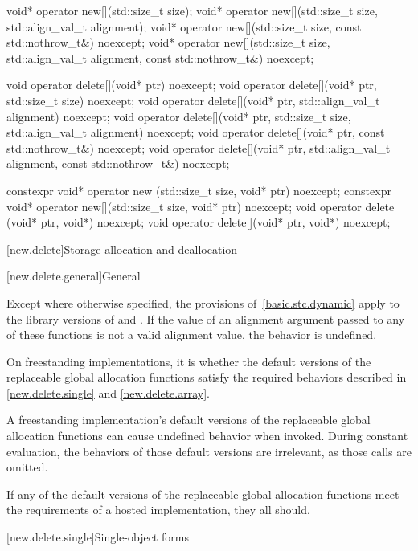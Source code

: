 \begin{codeblock}
void* operator new[](std::size_t size);
void* operator new[](std::size_t size, std::align_val_t alignment);
void* operator new[](std::size_t size, const std::nothrow_t&) noexcept;
void* operator new[](std::size_t size, std::align_val_t alignment,
                     const std::nothrow_t&) noexcept;

void operator delete[](void* ptr) noexcept;
void operator delete[](void* ptr, std::size_t size) noexcept;
void operator delete[](void* ptr, std::align_val_t alignment) noexcept;
void operator delete[](void* ptr, std::size_t size, std::align_val_t alignment) noexcept;
void operator delete[](void* ptr, const std::nothrow_t&) noexcept;
void operator delete[](void* ptr, std::align_val_t alignment, const std::nothrow_t&) noexcept;

constexpr void* operator new  (std::size_t size, void* ptr) noexcept;
constexpr void* operator new[](std::size_t size, void* ptr) noexcept;
void operator delete  (void* ptr, void*) noexcept;
void operator delete[](void* ptr, void*) noexcept;
\end{codeblock}

[new.delete]{Storage allocation and deallocation}

[new.delete.general]{General}

\pnum
Except where otherwise specified, the provisions of~\ref{basic.stc.dynamic}
apply to the library versions of  and .
If the value of an alignment argument
passed to any of these functions
is not a valid alignment value,
the behavior is undefined.

\pnum
On freestanding implementations,
it is 
whether the default versions of the replaceable global allocation functions
satisfy the required behaviors
described in \ref{new.delete.single} and \ref{new.delete.array}.
\begin{note}
A freestanding implementation's default versions of
the replaceable global allocation functions
can cause undefined behavior when invoked.
During constant evaluation,
the behaviors of those default versions are irrelevant,
as those calls are omitted.
\end{note}

\recommended
If any of the default versions of the replaceable global allocation functions
meet the requirements of a hosted implementation, they all should.

[new.delete.single]{Single-object forms}

